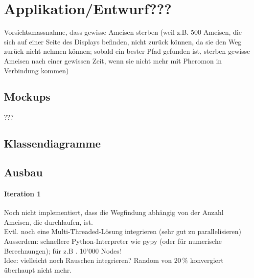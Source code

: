 
\chapter{Applikation/Entwurf???}



Vorsichtsmassnahme, dass gewisse Ameisen sterben (weil z.B. 500 Ameisen, die sich auf einer Seite des Displays befinden, nicht zurück können, da sie den Weg zurück nicht nehmen können; sobald ein bester Pfad gefunden ist, sterben gewisse Ameisen nach einer gewissen Zeit, wenn sie nicht mehr mit Pheromon in Verbindung kommen) \\

\section{Mockups}

???

\vspace*{2cm}



\section{Klassendiagramme}



\section*{Ausbau}

\subsubsection*{Iteration 1}

Noch nicht implementiert, dass die Wegfindung abhängig von der Anzahl Ameisen, die durchlaufen, ist. \\

Evtl. noch eine Multi-Threaded-Lösung integrieren (sehr gut zu parallelisieren) \\

Ausserdem: schnellere Python-Interpreter wie pypy (oder für numerische Berechnungen); für z.B . 10'000 Nodes! \\

Idee: vielleicht noch Rauschen integrieren? Random von 20\,\% konvergiert überhaupt nicht mehr.

\vspace*{3cm}


